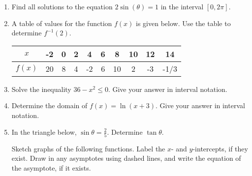 \documentclass[12pt]{article}
\begin{document}
\begin{enumerate}
\quad \hfill \underline{\hspace{2in}}
\vfill


\item Find all solutions to the equation $2\sin (\theta) = 1$ in the interval $[0, 2 \pi].$\\


\quad \hfill \underline{\hspace{2in}}
\vfill


\item A table of values for the function $f(x)$ is given below. Use the table to determine $f^{-1}(2).$

\begin{tabular}{|c||c|c|c|c|c|c|c|c|c|}
$x$&-2&0&2&4&6&8&10&12&14\\
\hline
$f(x)$&20&8&4&-2&6&10&2&-3&-1/3\\
\end{tabular}

\quad \hfill \underline{\hspace{2in}}
\vspace{.2in}

\item Solve the inequality $36-x^2\leq 0.$ Give your answer in interval notation.\\
\quad

\quad \hfill \underline{\hspace{2in}}
\vfill


\item Determine the domain of $f(x)=\ln(x+3).$ Give your answer in interval notation.\\
\quad

\quad \hfill \underline{\hspace{2in}}
\vfill


 \item In the triangle below, $\sin \theta = \frac{2}{5}.$ Determine $\tan \theta.$ \\ 
 
 \hfill \underline{\hspace{2in}}
\newpage
Sketch graphs of the following functions. Label the $x$- and $y$-intercepts, if they exist. Draw in any asymptotes using dashed lines, and write the equation of the asymptote, if it exists.
\begin{multicols}{2}{
      \vspace*{-0.45in}

}
\end{multicols}
\end{enumerate}
\end{document}
